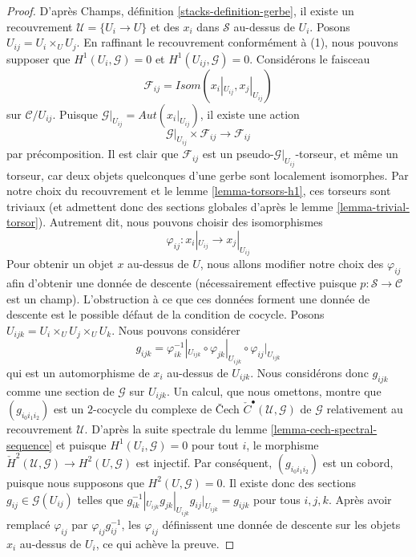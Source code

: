 \begin{proof}
D'après Champs, définition \ref{stacks-definition-gerbe}, il existe un
recouvrement $\mathcal{U} = \{U_i \to U\}$ et des $x_i$ dans $\mathcal{S}$
au-dessus de $U_i$. Posons $U_{ij} = U_i \times_U U_j$. En raffinant le
recouvrement conformément à (1), nous pouvons supposer que
$H^1(U_i, \mathcal{G}) = 0$ et $H^1(U_{ij}, \mathcal{G}) = 0$.
Considérons le faisceau
$$
\mathcal{F}_{ij} =
\mathit{Isom}(x_i|_{U_{ij}}, x_j|_{U_{ij}})
$$
sur $\mathcal{C}/U_{ij}$. Puisque
$\mathcal{G}|_{U_{ij}} = \mathit{Aut}(x_i|_{U_{ij}})$, il existe une action
$$
\mathcal{G}|_{U_{ij}} \times \mathcal{F}_{ij} \to \mathcal{F}_{ij}
$$
par précomposition. Il est clair que $\mathcal{F}_{ij}$ est un
pseudo-$\mathcal{G}|_{U_{ij}}$-torseur, et même un torseur, car deux objets
quelconques d'une gerbe sont localement isomorphes.
Par notre choix du recouvrement et le lemme \ref{lemma-torsors-h1}, ces
torseurs sont triviaux (et admettent donc des sections globales d'après le
lemme \ref{lemma-trivial-torsor}). Autrement dit, nous pouvons choisir des
isomorphismes
$$
\varphi_{ij} : x_i|_{U_{ij}} \longrightarrow x_j|_{U_{ij}}
$$
Pour obtenir un objet $x$ au-dessus de $U$, nous allons modifier notre choix
des $\varphi_{ij}$ afin d'obtenir une donnée de descente (nécessairement
effective puisque $p : \mathcal{S} \to \mathcal{C}$ est un champ).
L'obstruction à ce que ces données forment une donnée de descente est le
possible défaut de la condition de cocycle. Posons
$U_{ijk} = U_i \times_U U_j \times_U U_k$. Nous pouvons considérer
$$
g_{ijk} = \varphi_{ik}^{-1}|_{U_{ijk}} \circ \varphi_{jk}|_{U_{ijk}} \circ
\varphi_{ij}|_{U_{ijk}}
$$
qui est un automorphisme de $x_i$ au-dessus de $U_{ijk}$. Nous considérons
donc $g_{ijk}$ comme une section de $\mathcal{G}$ sur $U_{ijk}$.
Un calcul, que nous omettons, montre que $(g_{i_0i_1i_2})$ est un $2$-cocycle
du complexe de {\v C}ech ${\check C}^\bullet(\mathcal{U}, \mathcal{G})$ de
$\mathcal{G}$ relativement au recouvrement $\mathcal{U}$.
D'après la suite spectrale du lemme \ref{lemma-cech-spectral-sequence} et
puisque $H^1(U_i, \mathcal{G}) = 0$ pour tout $i$, le morphisme
${\check H}^2(\mathcal{U}, \mathcal{G}) \to H^2(U, \mathcal{G})$ est injectif.
Par conséquent, $(g_{i_0i_1i_2})$ est un cobord, puisque nous supposons que
$H^2(U, \mathcal{G}) = 0$. Il existe donc des sections
$g_{ij} \in \mathcal{G}(U_{ij})$ telles que
$g_{ik}^{-1}|_{U_{ijk}} g_{jk}|_{U_{ijk}}  g_{ij}|_{U_{ijk}} = g_{ijk}$
pour tous $i, j, k$.
Après avoir remplacé $\varphi_{ij}$ par $\varphi_{ij}g_{ij}^{-1}$, les
$\varphi_{ij}$ définissent une donnée de descente sur les objets $x_i$
au-dessus de $U_i$, ce qui achève la preuve.
\end{proof}












